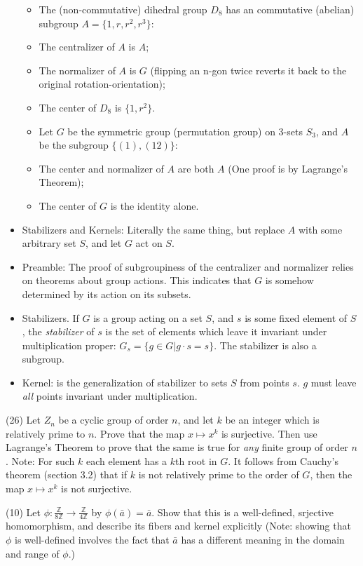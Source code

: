 \documentclass[1    0pt, answers]{exam} \renewcommand{\baselinestretch}{1.05}
\theoremstyle{plain}
\theoremstyle{definition}
\begin{document}
\begin{questions}
\begin{itemize}
\begin{itemize}
    \item The (non-commutative) dihedral group $D_8$ has an commutative (abelian) subgroup $A = \{ 1, r, r^2, r^3 \}$:
    \item The centralizer of $A$ is $A$;
    \item The normalizer of $A$ is $G$ (flipping an n-gon twice reverts it back to the original rotation-orientation);
    \item The center of $D_8$ is $\{1, r^2 \}$.
    \item Let $G$ be the symmetric group (permutation group) on 3-sets $S_3$, and $A$ be the subgroup $\{ (1), (1 2) \}$:
    \item The center and normalizer of $A$ are both $A$ (One proof is by Lagrange's Theorem);
    \item The center of $G$ is the identity alone.
\end{itemize}
\item Stabilizers and Kernels: Literally the same thing, but replace $A$ with some arbitrary set $S$, and let $G$ act on $S$.
\item Preamble: The proof of subgroupiness of the centralizer and normalizer relies on theorems about group actions. This indicates that $G$ is somehow determined by its action on its subsets.
\item Stabilizers. If $G$ is a group acting on a set $S$, and $s$ is some fixed element of $S$, the \emph{stabilizer} of $s$ is the set of elements which leave it invariant under multiplication proper: $G_s = \{ g \in G | g \cdot s = s \}$. The stabilizer is also a subgroup.
\item Kernel: is the generalization of stabilizer to sets $S$ from points $s$. $g$ must leave \emph{all} points invariant under multiplication.


\end{itemize}


\question (26) Let $Z_n$ be a cyclic group of order $n$, and let $k$ be an integer which is relatively prime to $n$. Prove that the map $x \mapsto x^k$ is surjective. Then use Lagrange's Theorem to prove that the same is true for \emph{any} finite group of order $n$. Note: For such $k$ each element has a $k$th root in $G$. It follows from Cauchy's theorem (section 3.2) that if $k$ is not relatively prime to the order of $G$, then the map $x \mapsto x^k$ is not surjective.


\question (10) Let $\phi : \frac{\mathbb{Z}}{8 \mathbb{Z}} \to \frac{\mathbb{Z}}{4 \mathbb{Z}}$ by $\phi(\bar{a}) = \bar{a}$. Show that this is a well-defined, srjective homomorphism, and describe its fibers and kernel explicitly (Note: showing that $\phi$ is well-defined involves the fact that $\bar{a}$ has a different meaning in the domain and range of $\phi$.)


\end{questions}
\end{document}
